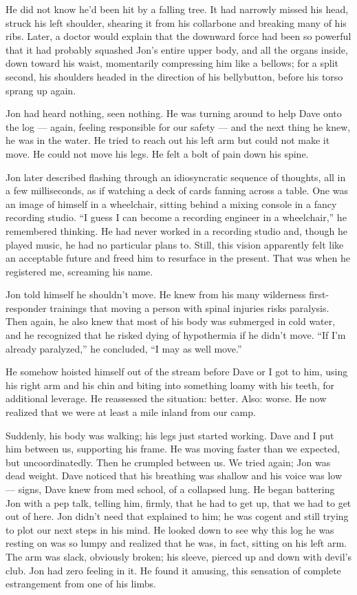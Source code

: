 He did not know he'd been hit by a falling tree. It had narrowly missed
his head, struck his left shoulder, shearing it from his collarbone and
breaking many of his ribs. Later, a doctor would explain that the
downward force had been so powerful that it had probably squashed Jon's
entire upper body, and all the organs inside, down toward his waist,
momentarily compressing him like a bellows; for a split second, his
shoulders headed in the direction of his bellybutton, before his torso
sprang up again.

Jon had heard nothing, seen nothing. He was turning around to help Dave
onto the log --- again, feeling responsible for our safety --- and the
next thing he knew, he was in the water. He tried to reach out his left
arm but could not make it move. He could not move his legs. He felt a
bolt of pain down his spine.

Jon later described flashing through an idiosyncratic sequence of
thoughts, all in a few milliseconds, as if watching a deck of cards
fanning across a table. One was an image of himself in a wheelchair,
sitting behind a mixing console in a fancy recording studio. ``I guess I
can become a recording engineer in a wheelchair,'' he remembered
thinking. He had never worked in a recording studio and, though he
played music, he had no particular plans to. Still, this vision
apparently felt like an acceptable future and freed him to resurface in
the present. That was when he registered me, screaming his name.

Jon told himself he shouldn't move. He knew from his many wilderness
first-responder trainings that moving a person with spinal injuries
risks paralysis. Then again, he also knew that most of his body was
submerged in cold water, and he recognized that he risked dying of
hypothermia if he didn't move. ``If I'm already paralyzed,'' he
concluded, ``I may as well move.''

He somehow hoisted himself out of the stream before Dave or I got to
him, using his right arm and his chin and biting into something loamy
with his teeth, for additional leverage. He reassessed the situation:
better. Also: worse. He now realized that we were at least a mile inland
from our camp.

Suddenly, his body was walking; his legs just started working. Dave and
I put him between us, supporting his frame. He was moving faster than we
expected, but uncoordinatedly. Then he crumpled between us. We tried
again; Jon was dead weight. Dave noticed that his breathing was shallow
and his voice was low --- signs, Dave knew from med school, of a
collapsed lung. He began battering Jon with a pep talk, telling him,
firmly, that he had to get up, that we had to get out of here. Jon
didn't need that explained to him; he was cogent and still trying to
plot our next steps in his mind. He looked down to see why this log he
was resting on was so lumpy and realized that he was, in fact, sitting
on his left arm. The arm was slack, obviously broken; his sleeve,
pierced up and down with devil's club. Jon had zero feeling in it. He
found it amusing, this sensation of complete estrangement from one of
his limbs.

